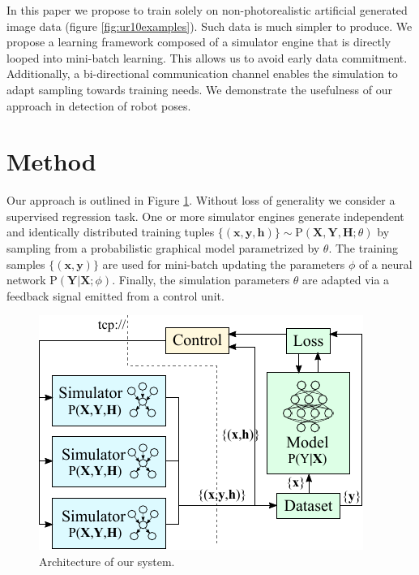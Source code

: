 \documentclass[conference]{IEEEtran}
\begin{document}
In this paper we propose to train solely on non-photorealistic artificial generated image data (figure \ref{fig:ur10examples}). Such data is much simpler to produce. We propose a learning framework composed of a simulator engine that is directly looped into mini-batch learning. This allows us to avoid early data commitment. Additionally, a bi-directional communication channel enables the simulation to adapt sampling towards training needs. We demonstrate the usefulness of our approach in detection of robot poses.


\section{Method}

    Our approach is outlined in Figure \ref{fig:architecture}. Without loss of generality we consider a supervised regression task. One or more simulator engines generate independent and identically distributed training tuples $\{(\textbf{x},\textbf{y},\textbf{h})\} \sim \mathrm{P}(\textbf{X},\textbf{Y},\textbf{H};\theta)$ by sampling from a probabilistic graphical model parametrized by $\theta$. The training samples $\{(\textbf{x},\textbf{y})\}$ are used for mini-batch updating the parameters $\phi$ of a neural network $\mathrm{P}(\textbf{Y} \lvert \textbf{X};\phi)$. Finally, the simulation parameters $\theta$ are adapted via a feedback signal emitted from a control unit.

    \begin{figure}[htbp]
        \centerline{\includegraphics[width=0.9\columnwidth]{figures/architecture/overview.pdf}}
        \caption{\label{fig:architecture} Architecture of our system.}
    \end{figure}
    
\end{document}
